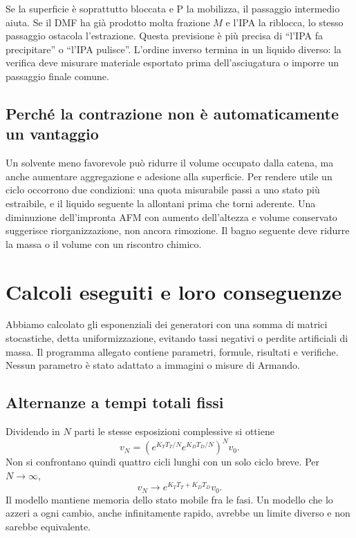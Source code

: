 \documentclass[11pt,reqno]{amsart}
\numberwithin{equation}{section}
\begin{document}
Se la superficie \`e soprattutto bloccata e P la mobilizza,
il passaggio intermedio aiuta. Se il DMF ha gi\`a prodotto molta
frazione $M$ e l'IPA la riblocca, lo stesso passaggio ostacola
l'estrazione. Questa previsione \`e pi\`u precisa di ``l'IPA fa
precipitare'' o ``l'IPA pulisce''. L'ordine inverso termina in
un liquido diverso: la verifica deve misurare materiale esportato
prima dell'asciugatura o imporre un passaggio finale comune.

\subsection{Perch\'e la contrazione non \`e automaticamente un vantaggio}
Un solvente meno favorevole pu\`o ridurre il volume occupato dalla
catena, ma anche aumentare aggregazione e adesione alla superficie.
Per rendere utile un ciclo occorrono due condizioni: una quota
misurabile passi a uno stato pi\`u estraibile, e il liquido seguente
la allontani prima che torni aderente. Una diminuzione dell'impronta
AFM con aumento dell'altezza e volume conservato suggerisce
riorganizzazione, non ancora rimozione. Il bagno seguente deve
ridurre la massa o il volume con un riscontro chimico.

\section{Calcoli eseguiti e loro conseguenze}
\label{sec:sim}

Abbiamo calcolato gli esponenziali dei generatori con una somma
di matrici stocastiche, detta uniformizzazione, evitando tassi
negativi o perdite artificiali di massa. Il programma allegato
contiene parametri, formule, risultati e verifiche. Nessun
parametro \`e stato adattato a immagini o misure di Armando.

\subsection{Alternanze a tempi totali fissi}
Dividendo in $N$ parti le stesse esposizioni complessive si ottiene
\begin{equation}\label{eq:cycles}
 v_N=\left(e^{K_TT_T/N}e^{K_DT_D/N}\right)^Nv_0.
\end{equation}
Non si confrontano quindi quattro cicli lunghi con un solo ciclo
breve. Per $N\to\infty$,
\begin{equation}\label{eq:trotter}
 v_N\longrightarrow e^{K_TT_T+K_DT_D}v_0.
\end{equation}
Il modello mantiene memoria dello stato mobile fra le fasi.
Un modello che lo azzeri a ogni cambio, anche infinitamente rapido,
avrebbe un limite diverso e non sarebbe equivalente.
\end{document}
